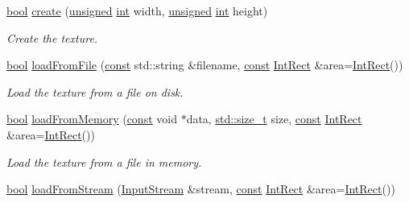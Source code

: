 \begin{DoxyCompactItemize}
\hyperlink{term__entry_8h_a002004ba5d663f149f6c38064926abac}{bool} \hyperlink{classsf_1_1_texture_a89b4c7d204acf1033c3a1b6e0a3ad0a3}{create} (\hyperlink{curses_8priv_8h_aca40206900cfc164654362fa8d4ad1e6}{unsigned} \hyperlink{term__entry_8h_ad65b480f8c8270356b45a9890f6499ae}{int} width, \hyperlink{curses_8priv_8h_aca40206900cfc164654362fa8d4ad1e6}{unsigned} \hyperlink{term__entry_8h_ad65b480f8c8270356b45a9890f6499ae}{int} height)
\begin{DoxyCompactList}\small\item\em Create the texture. \end{DoxyCompactList}\item 
\hyperlink{term__entry_8h_a002004ba5d663f149f6c38064926abac}{bool} \hyperlink{classsf_1_1_texture_a8e1b56eabfe33e2e0e1cb03712c7fcc7}{load\-From\-File} (\hyperlink{term__entry_8h_a57bd63ce7f9a353488880e3de6692d5a}{const} std\-::string \&filename, \hyperlink{term__entry_8h_a57bd63ce7f9a353488880e3de6692d5a}{const} \hyperlink{namespacesf_a1b1279ab06950b96686cffaacb72fed5}{Int\-Rect} \&area=\hyperlink{namespacesf_a1b1279ab06950b96686cffaacb72fed5}{Int\-Rect}())
\begin{DoxyCompactList}\small\item\em Load the texture from a file on disk. \end{DoxyCompactList}\item 
\hyperlink{term__entry_8h_a002004ba5d663f149f6c38064926abac}{bool} \hyperlink{classsf_1_1_texture_a2c4adb19dd4cbee0a588eeb85e52a249}{load\-From\-Memory} (\hyperlink{term__entry_8h_a57bd63ce7f9a353488880e3de6692d5a}{const} void $\ast$data, \hyperlink{nc__alloc_8h_a7b60c5629e55e8ec87a4547dd4abced4}{std\-::size\-\_\-t} size, \hyperlink{term__entry_8h_a57bd63ce7f9a353488880e3de6692d5a}{const} \hyperlink{namespacesf_a1b1279ab06950b96686cffaacb72fed5}{Int\-Rect} \&area=\hyperlink{namespacesf_a1b1279ab06950b96686cffaacb72fed5}{Int\-Rect}())
\begin{DoxyCompactList}\small\item\em Load the texture from a file in memory. \end{DoxyCompactList}\item 
\hyperlink{term__entry_8h_a002004ba5d663f149f6c38064926abac}{bool} \hyperlink{classsf_1_1_texture_a786b486a46b1c6d1c16ff4af61ecc601}{load\-From\-Stream} (\hyperlink{classsf_1_1_input_stream}{Input\-Stream} \&stream, \hyperlink{term__entry_8h_a57bd63ce7f9a353488880e3de6692d5a}{const} \hyperlink{namespacesf_a1b1279ab06950b96686cffaacb72fed5}{Int\-Rect} \&area=\hyperlink{namespacesf_a1b1279ab06950b96686cffaacb72fed5}{Int\-Rect}())

\end{DoxyCompactItemize}

